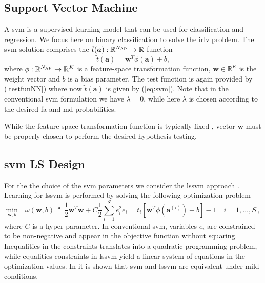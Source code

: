 \documentclass[draftcls,onecolumn,12pt]{IEEEtran}
\begin{document}
\subsection{Support Vector Machine}\label{sec:svm}
A \ac{svm} \cite{Bishop2006} is a supervised learning model that can be used for classification and regression. We focus here on binary classification to solve the \ac{irlv} problem. The \ac{svm} solution comprises the $\tilde{t}(\bm{a}): \mathbb{R}^{N_{\rm AP}} \to \mathbb{R}$  function 
\begin{equation}
\label{eq:svm}
\tilde{t}(\bm{a}) = \bm{w}^T \phi (\bm{a}) + b,
\end{equation}
where $\phi: \mathbb{R}^{N_{\rm AP}} \to \mathbb{R}^K$ is a feature-space transformation function, $\bm{w} \in \mathbb{R}^K$ is the weight vector and $b$ is a bias parameter. The test function is again provided by (\ref{testfunNN}) where now $\tilde{t}(\bm{a})$ is given by (\ref{eq:svm}). Note that in the conventional \ac{svm} formulation we have $\lambda = 0$, while here $\lambda$ is chosen according to the desired \ac{fa} and \ac{md} probabilities.

While the feature-space transformation function is typically fixed \cite{goodfellow}, vector $\bm{w}$ must be properly chosen to perform the desired hypothesis testing. 

\subsection{\ac{svm} LS Design}

For the the choice of the \ac{svm} parameters we consider the \ac{lssvm} approach \cite{Suykens1999}.  Learning for \ac{lssvm} is performed by solving the following optimization problem
\begin{subequations}
	\label{eq:lssvm}
	\begin{equation}
	\label{eq:lssvmOrig}
	\underset{\bm{w},b }{\text{min}} \quad \omega(\bm{w},b) \triangleq \frac{1}{2} \bm{w}^T \bm{w} + C \frac{1}{2} \sum_{i=1}^S e_i ^2 
	\end{equation}
	\begin{equation}
	\label{eq:stpart}
	e_i =   t_i[\bm{w}^T \phi (\bm{a}^{(i)}) + b]-1   \quad i = 1 ,\dots,S\,,
	\end{equation}
\end{subequations}
where $C$ is a hyper-parameter. In conventional \ac{svm}, variables $e_i$ are constrained to be non-negative and appear in the objective function without squaring. Inequalities in the constraints translates into a quadratic programming problem, while equalities constraints in \ac{lssvm} yield a linear system of equations in the optimization values. In \cite{Yevs} it is shown that \ac{svm} and \ac{lssvm} are equivalent under mild conditions.
\end{document}
